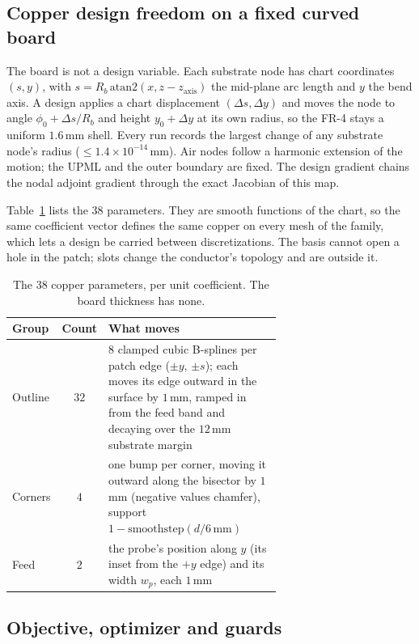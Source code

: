 \documentclass{anvil-paper}
\begin{document}
\subsection{Copper design freedom on a fixed curved board}
\label{sec:freedom}

The board is not a design variable. Each substrate node has chart
coordinates $(s, y)$, with $s = R_b\,\mathrm{atan2}(x, z - z_{\mathrm{axis}})$
the mid-plane arc length and $y$ the bend axis. A design applies a chart
displacement $(\Delta s, \Delta y)$ and moves the node to angle
$\phi_0 + \Delta s/R_b$ and height $y_0 + \Delta y$ at its own radius, so
the FR-4 stays a uniform $1.6$\,mm shell. Every run records the largest
change of any substrate node's radius ($\le 1.4\times10^{-14}$\,mm). Air
nodes follow a harmonic extension of the motion; the UPML and the outer
boundary are fixed. The design gradient chains the nodal adjoint gradient
through the exact Jacobian of this map.

Table~\ref{tab:dofs} lists the 38 parameters. They are smooth functions of
the chart, so the same coefficient vector defines the same copper on every
mesh of the family, which lets a design be carried between discretizations.
The basis cannot open a hole in the patch; slots change the conductor's
topology and are outside it.

\begin{table}[t]
  \centering
  \caption{The 38 copper parameters, per unit coefficient. The board
  thickness has none.}
  \label{tab:dofs}
  \small
  \begin{tabular}{@{}l c >{\raggedright\arraybackslash}p{0.66\linewidth}@{}}
    \toprule
    Group & Count & What moves \\
    \midrule
    Outline & $32$ & $8$ clamped cubic B-splines per patch edge ($\pm y$, $\pm s$); each moves its edge outward in the surface by $1$\,mm, ramped in from the feed band and decaying over the $12$\,mm substrate margin \\
    Corners & $4$ & one bump per corner, moving it outward along the bisector by $1$\,mm (negative values chamfer), support $1 - \mathrm{smoothstep}(d/6\,\mathrm{mm})$ \\
    Feed & $2$ & the probe's position along $y$ (its inset from the $+y$ edge) and its width $w_p$, each $1$\,mm \\
    \bottomrule
  \end{tabular}
\end{table}

\subsection{Objective, optimizer and guards}
\label{sec:objective}
\end{document}
